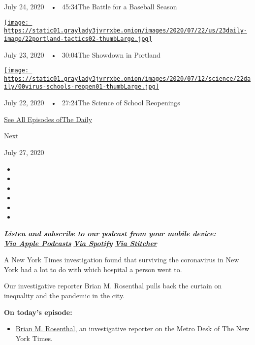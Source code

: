 July 24, 2020~~•~ 45:34The Battle for a Baseball Season

\href{https://www.nytimes3xbfgragh.onion/2020/07/23/podcasts/the-daily/portland-protests.html?action=click\&module=audio-series-bar\&region=header\&pgtype=Article}{\texttt{[image: https://static01.graylady3jvrrxbe.onion/images/2020/07/22/us/23daily-image/22portland-tactics02-thumbLarge.jpg]}}

July 23, 2020~~•~ 30:04The Showdown in Portland

\href{https://www.nytimes3xbfgragh.onion/2020/07/22/podcasts/the-daily/school-reopenings-coronavirus.html?action=click\&module=audio-series-bar\&region=header\&pgtype=Article}{\texttt{[image: https://static01.graylady3jvrrxbe.onion/images/2020/07/12/science/22daily/00virus-schools-reopen01-thumbLarge.jpg]}}

July 22, 2020~~•~ 27:24The Science of School Reopenings

\href{https://www.nytimes3xbfgragh.onion/column/the-daily}{See All
Episodes ofThe Daily}

Next

July 27, 2020

\begin{itemize}
\item
\item
\item
\item
\item
\item
\end{itemize}

\emph{\textbf{Listen and subscribe to our podcast from your mobile
device:}}\\
\textbf{\href{https://itunes.apple.com/us/podcast/the-daily/id1200361736?mt=2}{\emph{Via
Apple Podcasts}}} \emph{\textbf{\textbar{}}}
\textbf{\href{https://open.spotify.com/show/3IM0lmZxpFAY7CwMuv9H4g?si=SfuMSC55R1qprFsRZU3_zw}{\emph{Via
Spotify}}} \emph{\textbf{\textbar{}}}
\textbf{\href{http://www.stitcher.com/podcast/the-new-york-times/the-daily-10}{\emph{Via
Stitcher}}}

A New York Times investigation found that surviving the coronavirus in
New York had a lot to do with which hospital a person went to.

Our investigative reporter Brian M. Rosenthal pulls back the curtain on
inequality and the pandemic in the city.

\textbf{On today's episode:}

\begin{itemize}
\tightlist
\item
  \href{https://www.nytimes3xbfgragh.onion/by/brian-m-rosenthal}{Brian
  M. Rosenthal}, an investigative reporter on the Metro Desk of The New
  York Times.
\end{itemize}

